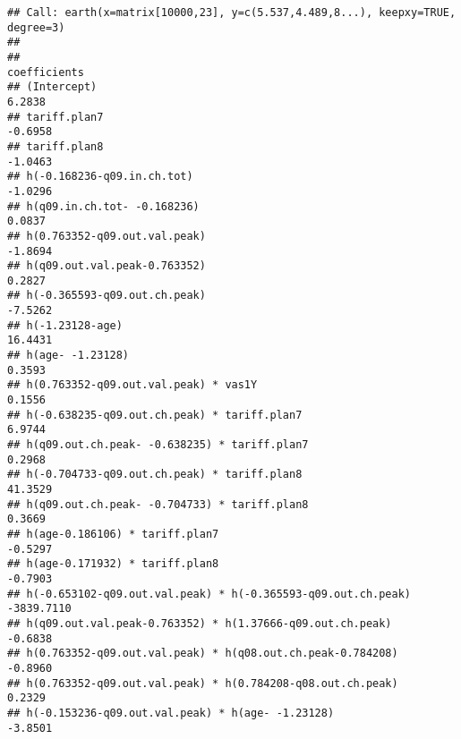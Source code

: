 \documentclass[
]{article}
\begin{document}
\begin{verbatim}
## Call: earth(x=matrix[10000,23], y=c(5.537,4.489,8...), keepxy=TRUE, degree=3)
## 
##                                                                                                coefficients
## (Intercept)                                                                                          6.2838
## tariff.plan7                                                                                        -0.6958
## tariff.plan8                                                                                        -1.0463
## h(-0.168236-q09.in.ch.tot)                                                                          -1.0296
## h(q09.in.ch.tot- -0.168236)                                                                          0.0837
## h(0.763352-q09.out.val.peak)                                                                        -1.8694
## h(q09.out.val.peak-0.763352)                                                                         0.2827
## h(-0.365593-q09.out.ch.peak)                                                                        -7.5262
## h(-1.23128-age)                                                                                     16.4431
## h(age- -1.23128)                                                                                     0.3593
## h(0.763352-q09.out.val.peak) * vas1Y                                                                 0.1556
## h(-0.638235-q09.out.ch.peak) * tariff.plan7                                                          6.9744
## h(q09.out.ch.peak- -0.638235) * tariff.plan7                                                         0.2968
## h(-0.704733-q09.out.ch.peak) * tariff.plan8                                                         41.3529
## h(q09.out.ch.peak- -0.704733) * tariff.plan8                                                         0.3669
## h(age-0.186106) * tariff.plan7                                                                      -0.5297
## h(age-0.171932) * tariff.plan8                                                                      -0.7903
## h(-0.653102-q09.out.val.peak) * h(-0.365593-q09.out.ch.peak)                                     -3839.7110
## h(q09.out.val.peak-0.763352) * h(1.37666-q09.out.ch.peak)                                           -0.6838
## h(0.763352-q09.out.val.peak) * h(q08.out.ch.peak-0.784208)                                          -0.8960
## h(0.763352-q09.out.val.peak) * h(0.784208-q08.out.ch.peak)                                           0.2329
## h(-0.153236-q09.out.val.peak) * h(age- -1.23128)                                                    -3.8501

\end{verbatim}
\end{document}
